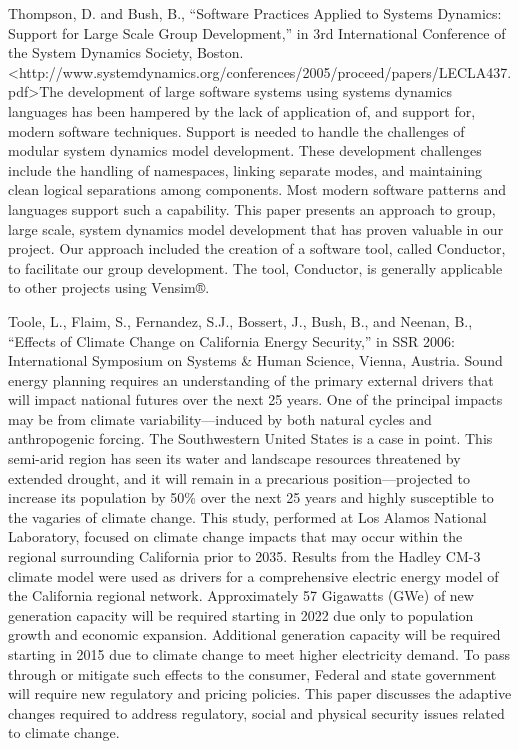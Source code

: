 \documentclass[]{article}
\begin{document}
Thompson, D. and Bush, B., ``Software Practices Applied to Systems
Dynamics: Support for Large Scale Group Development,'' in 3rd
International Conference of the System Dynamics Society, Boston.
\textless{}http://www.systemdynamics.org/conferences/2005/proceed/papers/LECLA437.pdf\textgreater{}The
development of large software systems using systems dynamics languages
has been hampered by the lack of application of, and support for, modern
software techniques. Support is needed to handle the challenges of
modular system dynamics model development. These development challenges
include the handling of namespaces, linking separate modes, and
maintaining clean logical separations among components. Most modern
software patterns and languages support such a capability. This paper
presents an approach to group, large scale, system dynamics model
development that has proven valuable in our project. Our approach
included the creation of a software tool, called Conductor, to
facilitate our group development. The tool, Conductor, is generally
applicable to other projects using Vensim®.

Toole, L., Flaim, S., Fernandez, S.J., Bossert, J., Bush, B., and
Neenan, B., ``Effects of Climate Change on California Energy Security,''
in SSR 2006: International Symposium on Systems \& Human Science,
Vienna, Austria. Sound energy planning requires an understanding of the
primary external drivers that will impact national futures over the next
25 years. One of the principal impacts may be from climate
variability---induced by both natural cycles and anthropogenic forcing.
The Southwestern United States is a case in point. This semi-arid region
has seen its water and landscape resources threatened by extended
drought, and it will remain in a precarious position---projected to
increase its population by 50\% over the next 25 years and highly
susceptible to the vagaries of climate change. This study, performed at
Los Alamos National Laboratory, focused on climate change impacts that
may occur within the regional surrounding California prior to 2035.
Results from the Hadley CM-3 climate model were used as drivers for a
comprehensive electric energy model of the California regional network.
Approximately 57 Gigawatts (GWe) of new generation capacity will be
required starting in 2022 due only to population growth and economic
expansion. Additional generation capacity will be required starting in
2015 due to climate change to meet higher electricity demand. To pass
through or mitigate such effects to the consumer, Federal and state
government will require new regulatory and pricing policies. This paper
discusses the adaptive changes required to address regulatory, social
and physical security issues related to climate change.
\end{document}
